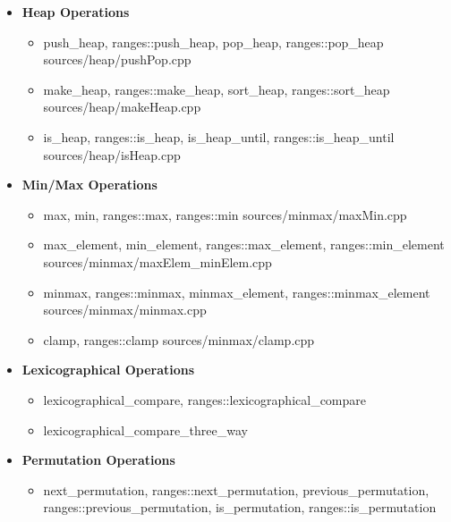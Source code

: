 \documentclass{article}
\begin{document}
\begin{itemize}
\begin{itemize}
               {sources/merge/merge.cpp}
          \end{itemize}
        \item \textbf{Heap Operations}
          \begin{itemize}
            \item push\_heap, ranges::push\_heap, pop\_heap, ranges::pop\_heap
               {sources/heap/pushPop.cpp}
            \item make\_heap, ranges::make\_heap, sort\_heap, ranges::sort\_heap
               {sources/heap/makeHeap.cpp}
            \item is\_heap, ranges::is\_heap, is\_heap\_until, ranges::is\_heap\_until
               {sources/heap/isHeap.cpp}
          \end{itemize}
        \item \textbf{Min/Max Operations}
          \begin{itemize}
            \item max, min, ranges::max, ranges::min
               {sources/minmax/maxMin.cpp}
            \item max\_element, min\_element, ranges::max\_element, ranges::min\_element
               {sources/minmax/maxElem_minElem.cpp}
            \item minmax, ranges::minmax, minmax\_element, ranges::minmax\_element
               {sources/minmax/minmax.cpp}
            \item clamp, ranges::clamp
               {sources/minmax/clamp.cpp}
          \end{itemize}
        \item \textbf{Lexicographical Operations}
          \begin{itemize}
            \item lexicographical\_compare, ranges::lexicographical\_compare
            \item lexicographical\_compare\_three\_way
          \end{itemize}
        \item \textbf{Permutation Operations}
          \begin{itemize}
            \item next\_permutation, ranges::next\_permutation, previous\_permutation, \\
              ranges::previous\_permutation, is\_permutation, ranges::is\_permutation

\end{itemize}
\end{itemize}
\end{document}
